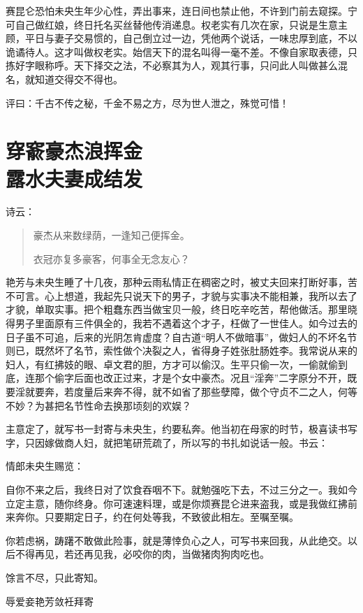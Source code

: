 \documentclass[a4paper,12pt,UTF8,twoside]{ctexbook}
\begin{document}
赛昆仑恐怕未央生年少心性，弄出事来，连日间也禁止他，不许到门前去窥探。宁可自己做红娘，终日托名买丝替他传消递息。权老实有几次在家，只说是生意主顾，平日与妻子交易惯的，自己倒立过一边，凭他两个说话，一味忠厚到底，不以诡谲待人。这才叫做权老实。始信天下的混名叫得一毫不差。不像自家取表德，只拣好字眼称呼。天下择交之法，不必察其为人，观其行事，只问此人叫做甚么混名，就知道交得交不得也。

评曰：千古不传之秘，千金不易之方，尽为世人泄之，殊觉可惜！

\chapter[穿窬豪杰浪挥金\ 露水夫妻成结发]{穿窬豪杰浪挥金\\露水夫妻成结发}

诗云：

\begin{quotation}
豪杰从来数绿荫，一逢知己便挥金。

衣冠亦复多豪客，何事全无念友心？
\end{quotation}

艳芳与未央生睡了十几夜，那种云雨私情正在稠密之时，被丈夫回来打断好事，苦不可言。心上想道，我起先只说天下的男子，才貌与实事决不能相兼，我所以去了才貌，单取实事。把个粗蠢东西当做宝贝一般，终日吃辛吃苦，帮他做活。那里晓得男子里面原有三件俱全的，我若不遇着这个才子，枉做了一世佳人。如今过去的日子虽不可追，后来的光阴怎肯虚度？自古道“明人不做暗事”，做妇人的不坏名节则已，既然坏了名节，索性做个决裂之人，省得身子姓张肚肠姓李。我常说从来的妇人，有红拂妓的眼、卓文君的胆，方才可以偷汉。生平只偷一次，一偷就偷到底，连那个偷字后面也改正过来，才是个女中豪杰。况且“淫奔”二字原分不开，既要淫就要奔，若度量后来奔不得，就不如省了那些孽障，做个守贞不二之人，何等不妙？为甚把名节性命去换那顷刻的欢娱？

主意定了，就写书一封寄与未央生，约要私奔。他当初在母家的时节，极喜读书写字，只因嫁做商人妇，就把笔研荒疏了，所以写的书扎如说话一般。书云：

情郎未央生赐览：

自你不来之后，我终日对了饮食吞咽不下。就勉强吃下去，不过三分之一。我如今立定主意，随你终身。你可速速料理，或是你烦赛昆仑进来盗我，或是我做红拂前来奔你。只要期定日子，约在何处等我，不致彼此相左。至嘱至嘱。

你若虑祸，踌躇不敢做此险事，就是薄悻负心之人，可写书来回我，从此绝交。以后不得再见，若还再见我，必咬你的肉，当做猪肉狗肉吃也。

馀言不尽，只此寄知。

辱爱妾艳芳敛衽拜寄
\end{document}

